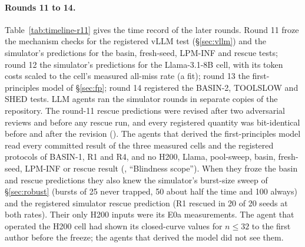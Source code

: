 \paragraph{Rounds 11 to 14.} Table~\ref{tab:timeline-r11} gives the time record of the later rounds. Round 11 froze the mechanism checks for the registered vLLM test (\S\ref{sec:vllm}) and the simulator's predictions for the basin, fresh-seed, LPM-INF and rescue tests; round 12 the simulator's predictions for the Llama-3.1-8B cell, with its token costs scaled to the cell's measured all-miss rate (a fit); round 13 the first-principles model of \S\ref{sec:fp}; round 14 registered the BASIN-2, TOOLSLOW and SHED tests. LLM agents ran the simulator rounds in separate copies of the repository. The round-11 rescue predictions were revised after two adversarial reviews and before any rescue run, and every registered quantity was bit-identical before and after the revision (). The agents that derived the first-principles model read every committed result of the three measured cells and the registered protocols of BASIN-1, R1 and R4, and no H200, Llama, pool-sweep, basin, fresh-seed, LPM-INF or rescue result (, ``Blindness scope''). When they froze the basin and rescue predictions they also knew the simulator's burst-size sweep of \S\ref{sec:robust} (bursts of 25 never trapped, 50 about half the time and 100 always) and the registered simulator rescue prediction (R1 rescued in 20 of 20 seeds at both rates). Their only H200 inputs were its E0a measurements. The agent that operated the H200 cell had shown its closed-curve values for $n\le32$ to the first author before the freeze; the agents that derived the model did not see them.

